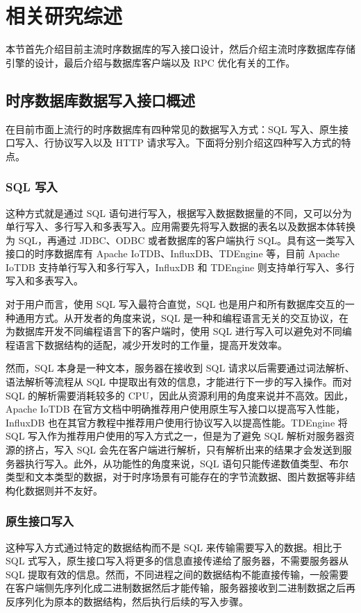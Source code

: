 
\chapter{相关研究综述}
本节首先介绍目前主流时序数据库的写入接口设计，然后介绍主流时序数据库存储引擎的设计，最后介绍与数据库客户端以及 RPC 优化有关的工作。
\section{时序数据库数据写入接口概述}
在目前市面上流行的时序数据库有四种常见的数据写入方式：SQL 写入、原生接口写入、行协议写入以及 HTTP 请求写入。下面将分别介绍这四种写入方式的特点。
\subsection{SQL 写入}
这种方式就是通过 SQL 语句进行写入，根据写入数据数据量的不同，又可以分为单行写入、多行写入和多表写入。应用需要先将写入数据的表名以及数据本体转换为 SQL，再通过 JDBC、ODBC 或者数据库的客户端执行 SQL。具有这一类写入接口的时序数据库有 Apache IoTDB、InfluxDB、TDEngine 等，目前 Apache IoTDB 支持单行写入和多行写入，InfluxDB 和 TDEngine 则支持单行写入、多行写入和多表写入。

对于用户而言，使用 SQL 写入最符合直觉，SQL 也是用户和所有数据库交互的一种通用方式。从开发者的角度来说，SQL 是一种和编程语言无关的交互协议，在为数据库开发不同编程语言下的客户端时，使用 SQL 进行写入可以避免对不同编程语言下数据结构的适配，减少开发时的工作量，提高开发效率。

然而，SQL 本身是一种文本，服务器在接收到 SQL 请求以后需要通过词法解析、语法解析等流程从 SQL 中提取出有效的信息，才能进行下一步的写入操作。而对 SQL 的解析需要消耗较多的 CPU，因此从资源利用的角度来说并不高效。因此，Apache IoTDB 在官方文档中明确推荐用户使用原生写入接口以提高写入性能\cite{iotdb2024javanative}，InfluxDB 也在其官方教程中推荐用户使用行协议写入以提高性能\cite{influx2024highperformance}。TDEngine 将 SQL 写入作为推荐用户使用的写入方式之一，但是为了避免 SQL 解析对服务器资源的挤占，写入 SQL 会先在客户端进行解析，只有解析出来的结果才会发送到服务器执行写入。此外，从功能性的角度来说，SQL 语句只能传递数值类型、布尔类型和文本类型的数据，对于时序场景有可能存在的字节流数据、图片数据等非结构化数据则并不友好。
\subsection{原生接口写入}
这种写入方式通过特定的数据结构而不是 SQL 来传输需要写入的数据。相比于 SQL 式写入，原生接口写入将更多的信息直接传递给了服务器，不需要服务器从 SQL 提取有效的信息。然而，不同进程之间的数据结构不能直接传输，一般需要在客户端侧先序列化成二进制数据然后才能传输，服务器接收到二进制数据之后再反序列化为原本的数据结构，然后执行后续的写入步骤。

